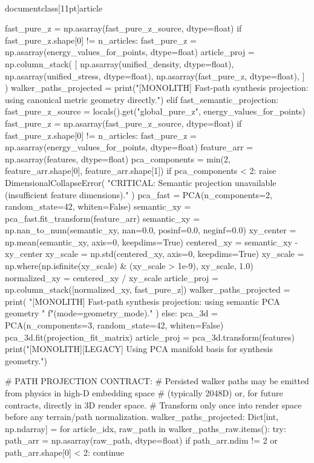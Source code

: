 \\documentclass[11pt]{article}
\begin{document}
\begin{CodeBlock}
{{{{{        fast_pure_z = np.asarray(fast_pure_z_source, dtype=float)
        if fast_pure_z.shape[0] != n_articles:
            fast_pure_z = np.asarray(energy_values_for_points, dtype=float)
        article_proj = np.column_stack(
            [
                np.asarray(unified_density, dtype=float),
                np.asarray(unified_stress, dtype=float),
                np.asarray(fast_pure_z, dtype=float),
            ]
        )
        walker_paths_projected = {}
        print("[MONOLITH] Fast-path synthesis projection: using canonical metric geometry directly.")
    elif fast_semantic_projection:
        fast_pure_z_source = locals().get("global_pure_z", energy_values_for_points)
        fast_pure_z = np.asarray(fast_pure_z_source, dtype=float)
        if fast_pure_z.shape[0] != n_articles:
            fast_pure_z = np.asarray(energy_values_for_points, dtype=float)
        feature_arr = np.asarray(features, dtype=float)
        pca_components = min(2, feature_arr.shape[0], feature_arr.shape[1])
        if pca_components < 2:
            raise DimensionalCollapseError(
                "CRITICAL: Semantic projection unavailable (insufficient feature dimensions)."
            )
        pca_fast = PCA(n_components=2, random_state=42, whiten=False)
        semantic_xy = pca_fast.fit_transform(feature_arr)
        semantic_xy = np.nan_to_num(semantic_xy, nan=0.0, posinf=0.0, neginf=0.0)
        xy_center = np.mean(semantic_xy, axis=0, keepdims=True)
        centered_xy = semantic_xy - xy_center
        xy_scale = np.std(centered_xy, axis=0, keepdims=True)
        xy_scale = np.where(np.isfinite(xy_scale) & (xy_scale > 1e-9), xy_scale, 1.0)
        normalized_xy = centered_xy / xy_scale
        article_proj = np.column_stack([normalized_xy, fast_pure_z])
        walker_paths_projected = {}
        print(
            "[MONOLITH] Fast-path synthesis projection: using semantic PCA geometry "
            f"(mode={geometry_mode})."
        )
    else:
        pca_3d = PCA(n_components=3, random_state=42, whiten=False)
        pca_3d.fit(projection_fit_matrix)
        article_proj = pca_3d.transform(features)
        print("[MONOLITH][LEGACY] Using PCA manifold basis for synthesis geometry.")

        # PATH PROJECTION CONTRACT:
        # Persisted walker paths may be emitted from physics in high-D embedding space
        # (typically 2048D) or, for future contracts, directly in 3D render space.
        # Transform only once into render space before any terrain/path normalization.
        walker_paths_projected: Dict[int, np.ndarray] = {}
        for article_idx, raw_path in walker_paths_raw.items():
            try:
                path_arr = np.asarray(raw_path, dtype=float)
                if path_arr.ndim != 2 or path_arr.shape[0] < 2:
                    continue

}}}}}
\end{CodeBlock}
\end{document}
